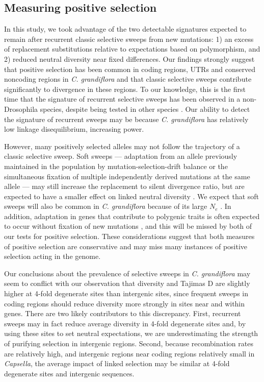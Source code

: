 \subsection{Measuring positive selection}
	In this study, we took advantage of the two detectable signatures expected to remain after recurrent classic selective sweeps from new mutations: 1) an excess of replacement substitutions relative to expectations based on polymorphism, and 2) reduced neutral diversity near fixed differences. Our findings strongly suggest that positive selection has been common in coding regions, UTRs and conserved noncoding regions in \textit{C. grandiflora} and that classic selective sweeps contribute significantly to divergence in these regions. To our knowledge, this is the first time that the signature of recurrent selective sweeps has been observed in a non-Drosophila species, despite being tested in other species \citep{Halligan2013,hernandez2011}. Our ability to detect the signature of recurrent sweeps may be because \textit{C. grandiflora} has relatively low linkage disequilibrium, increasing power.

However, many positively selected alleles may not follow the trajectory of a classic selective sweep. Soft sweeps — adaptation from an allele previously maintained in the population by mutation-selection-drift balance or the simultaneous fixation of multiple independently derived mutations at the same allele — may still increase the replacement to silent divergence ratio, but are expected to have a smaller effect on linked neutral diversity \citep{hermisson2005,pennings2006_2,pennings2006_3}. We expect that soft sweeps will also be common in \textit{C. grandiflora} because of its large $N_{e}$ \citep{hermisson2005,messer2013}. In addition, adaptation in genes that contribute to polygenic traits is often expected to occur without fixation of new mutations \citep{pavlidis2012}, and this will be missed by both of our tests for positive selection. These considerations suggest that both measures of positive selection are conservative and may miss many instances of positive selection acting in the genome.

Our conclusions about the prevalence of selective sweeps in \textit{C. grandiflora} may seem to conflict with our observation that diversity and Tajima\textsc{}s D are slightly higher at 4-fold degenerate sites than intergenic sites, since frequent sweeps in coding regions should reduce diversity more strongly in sites near and within genes. There are two likely contributors to this discrepancy. First, recurrent sweeps may in fact reduce average diversity in 4-fold degenerate sites and, by using these sites to set neutral expectations, we are underestimating the strength of purifying selection in intergenic regions. Second, because recombination rates are relatively high, and intergenic regions near coding regions relatively small in \textit{Capsella}, the average impact of linked selection may be similar at 4-fold degenerate sites and intergenic sequences. 

